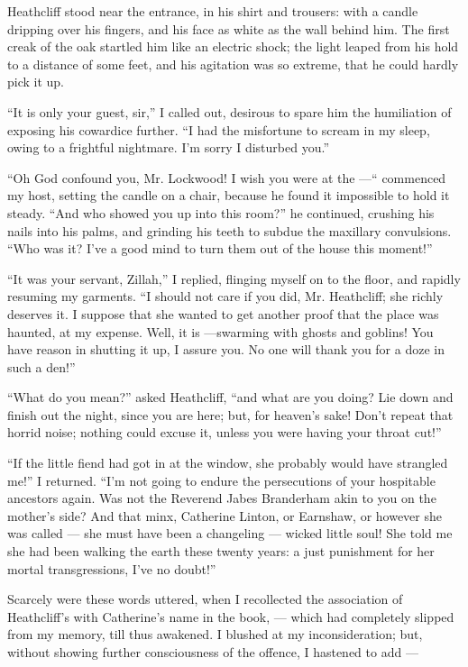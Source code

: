 \par Heathcliff stood near the entrance, in his shirt and trousers: with a candle dripping over his fingers, and his face as white as the wall behind him. The first creak of the oak startled him like an electric shock; the light leaped from his hold to a distance of some feet, and his agitation was so extreme, that he could hardly pick it up.
\par “It is only your guest, sir,” I called out, desirous to spare him the humiliation of exposing his cowardice further. “I had the misfortune to scream in my sleep, owing to a frightful nightmare. I'm sorry I disturbed you.”
\par “Oh God confound you, Mr. Lockwood! I wish you were at the —“ commenced my host, setting the candle on a chair, because he found it impossible to hold it steady. “And who showed you up into this room?” he continued, crushing his nails into his palms, and grinding his teeth to subdue the maxillary convulsions. “Who was it? I've a good mind to turn them out of the house this moment!”
\par “It was your servant, Zillah,” I replied, flinging myself on to the floor, and rapidly resuming my garments. “I should not care if you did, Mr. Heathcliff; she richly deserves it. I suppose that she wanted to get another proof that the place was haunted, at my expense. Well, it is —swarming with ghosts and goblins! You have reason in shutting it up, I assure you. No one will thank you for a doze in such a den!”
\par “What do you mean?” asked Heathcliff, “and what are you doing? Lie down and finish out the night, since you are here; but, for heaven's sake! Don't repeat that horrid noise; nothing could excuse it, unless you were having your throat cut!”
\par “If the little fiend had got in at the window, she probably would have strangled me!” I returned. “I'm not going to endure the persecutions of your hospitable ancestors again. Was not the Reverend Jabes Branderham akin to you on the mother's side? And that minx, Catherine Linton, or Earnshaw, or however she was called — she must have been a changeling — wicked little soul! She told me she had been walking the earth these twenty years: a just punishment for her mortal transgressions, I've no doubt!”
\par Scarcely were these words uttered, when I recollected the association of Heathcliff's with Catherine's name in the book, — which had completely slipped from my memory, till thus awakened. I blushed at my inconsideration; but, without showing further consciousness of the offence, I hastened to add —
